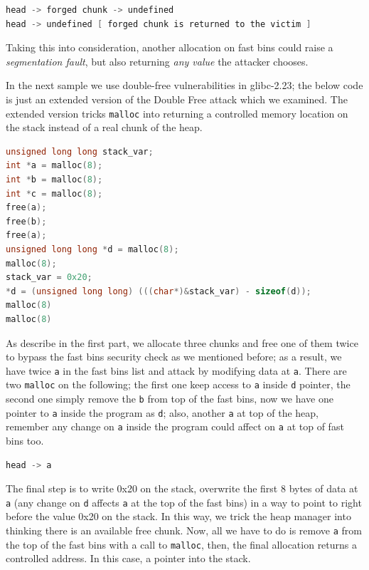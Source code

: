 \documentclass{masterthesis}
\newcommand*\libc{glibc}
\newcommand*\fb{fast bins}
\newcommand*\mallocc{\lstinline{malloc}\xspace}
\begin{document}
\begin{lstlisting}[language=c,frame=tlrb]
head -> forged chunk -> undefined
head -> undefined [ forged chunk is returned to the victim ]
\end{lstlisting}

Taking this into consideration, another allocation on \fb{} could raise a \emph{segmentation fault}, but also returning \emph{any value} the attacker chooses.

In the next sample we use double-free vulnerabilities in \libc{-2.23}; the below code is just an extended version of the Double Free attack which we examined. The extended version tricks \mallocc{} into returning a controlled memory location on the stack instead of a real chunk of the heap.

\begin{lstlisting}[language=c,frame=tlrb]
unsigned long long stack_var;
int *a = malloc(8);
int *b = malloc(8);
int *c = malloc(8);
free(a);
free(b);
free(a);
unsigned long long *d = malloc(8);
malloc(8);
stack_var = 0x20;
*d = (unsigned long long) (((char*)&stack_var) - sizeof(d));
malloc(8)
malloc(8)
\end{lstlisting}

As describe in the first part, we allocate three chunks and free one of them twice to bypass the \fb{} security check as we mentioned before; as a result, we have twice \lstinline{a} in the \fb{} list and attack by modifying data at \lstinline{a}. There are two \mallocc{} on the following; the first one keep access to \lstinline{a} inside \lstinline{d} pointer, the second one simply remove the \lstinline{b} from top of the \fb{}, now we have one pointer to \lstinline{a} inside the program as \lstinline{d}; also, another \lstinline{a} at top of the heap, remember any change on \lstinline{a} inside the program could affect on \lstinline{a} at top of \fb{} too.

\begin{lstlisting}[language=c,frame=tlrb]
head -> a
\end{lstlisting}

The final step is to write 0x20 on the stack, overwrite the first 8 bytes of data at \lstinline{a} (any change on \lstinline{d} affects \lstinline{a} at the top of the \fb{}) in a way to point to right before the value 0x20 on the stack. In this way, we trick the heap manager into thinking there is an available free chunk.
Now, all we have to do is remove \lstinline{a} from the top of the \fb{} with a call to \mallocc{}, then, the final allocation returns a controlled address. In this case, a pointer into the stack.
\end{document}
